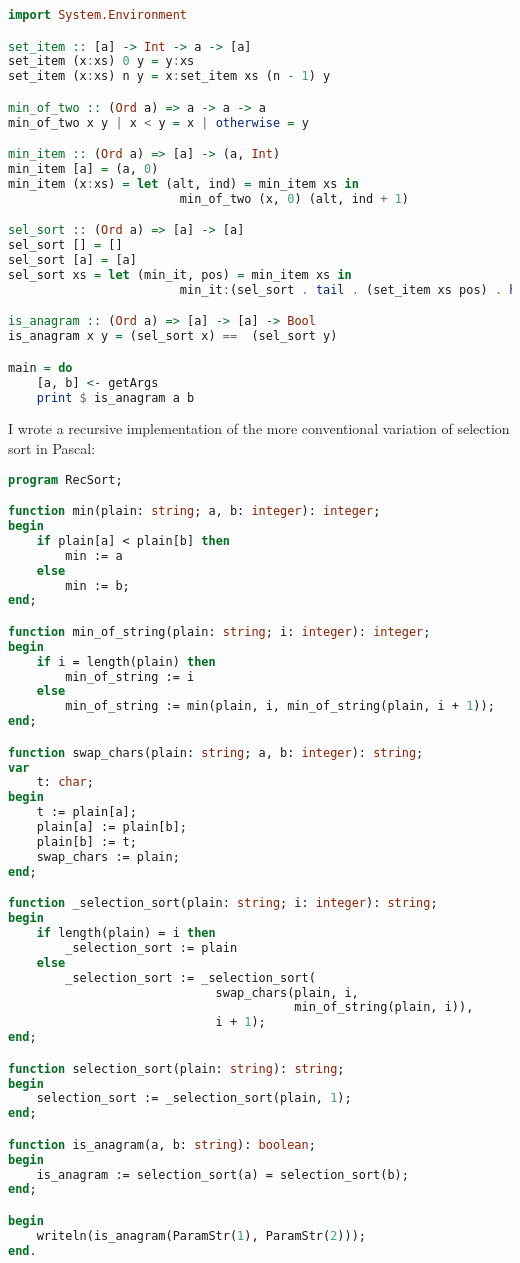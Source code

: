 \documentclass{article}
\begin{document}
\begin{lstlisting}[language=Haskell, caption=Selection sort in Haskell]
import System.Environment

set_item :: [a] -> Int -> a -> [a]
set_item (x:xs) 0 y = y:xs
set_item (x:xs) n y = x:set_item xs (n - 1) y

min_of_two :: (Ord a) => a -> a -> a
min_of_two x y | x < y = x | otherwise = y

min_item :: (Ord a) => [a] -> (a, Int)
min_item [a] = (a, 0)
min_item (x:xs) = let (alt, ind) = min_item xs in
                        min_of_two (x, 0) (alt, ind + 1)

sel_sort :: (Ord a) => [a] -> [a]
sel_sort [] = []
sel_sort [a] = [a]
sel_sort xs = let (min_it, pos) = min_item xs in
                        min_it:(sel_sort . tail . (set_item xs pos) . head) xs

is_anagram :: (Ord a) => [a] -> [a] -> Bool
is_anagram x y = (sel_sort x) ==  (sel_sort y)

main = do
    [a, b] <- getArgs
    print $ is_anagram a b
\end{lstlisting}
\iffalse $ \fi %

    I wrote a recursive implementation of the more conventional variation of
    selection sort in Pascal:

\begin{lstlisting}[language=Pascal, caption=Recursive selection sort in Pascal]
program RecSort;

function min(plain: string; a, b: integer): integer;
begin
    if plain[a] < plain[b] then
        min := a
    else
        min := b;
end;

function min_of_string(plain: string; i: integer): integer;
begin
    if i = length(plain) then
        min_of_string := i
    else
        min_of_string := min(plain, i, min_of_string(plain, i + 1));
end;

function swap_chars(plain: string; a, b: integer): string;
var
    t: char;
begin
    t := plain[a];
    plain[a] := plain[b];
    plain[b] := t;
    swap_chars := plain;
end;

function _selection_sort(plain: string; i: integer): string;
begin
    if length(plain) = i then
        _selection_sort := plain
    else
        _selection_sort := _selection_sort(
                             swap_chars(plain, i,
                                        min_of_string(plain, i)),
                             i + 1);
end;

function selection_sort(plain: string): string;
begin
    selection_sort := _selection_sort(plain, 1);
end;

function is_anagram(a, b: string): boolean;
begin
    is_anagram := selection_sort(a) = selection_sort(b);
end;

begin
    writeln(is_anagram(ParamStr(1), ParamStr(2)));
end.
\end{lstlisting}
\end{document}
